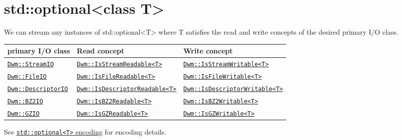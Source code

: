\begin{minipage}{\textwidth}
\section{\ttfamily std::optional<class T>}
We can stream any instances of {\ttfamily std::optional<T>} where
{\ttfamily T} satisfies the read and write concepts of the desired
primary I/O class.
\vspace{1ex}

\begin{tabular}{lll}
  \textbf{primary I/O class} & \textbf{Read concept} & \textbf{Write concept} \\ \hline
  \hyperref[section:DwmStreamIOClass]{\texttt{Dwm::StreamIO}} & \hyperref[concept:DwmIsStreamReadable]{\texttt{Dwm::IsStreamReadable<T>}} & \hyperref[concept:DwmIsStreamWritable]{\texttt{Dwm::IsStreamWritable<T>}} \\
  \hyperref[section:DwmFileIOClass]{\texttt{Dwm::FileIO}} & \hyperref[concept:DwmIsFileReadable]{\texttt{Dwm::IsFileReadable<T>}} & \hyperref[concept:DwmIsFileWritable]{\texttt{Dwm::IsFileWritable<T>}} \\
  \hyperref[section:DwmDescriptorIOClass]{\texttt{Dwm::DescriptorIO}} & \hyperref[concept:DwmIsDescriptorReadable]{\texttt{Dwm::IsDescriptorReadable<T>}} & \hyperref[concept:DwmIsDescriptorWritable]{\texttt{Dwm::IsDescriptorWritable<T>}} \\
  \hyperref[section:DwmBZ2IOClass]{\texttt{Dwm::BZ2IO}} & \hyperref[concept:DwmIsBZ2Readable]{\texttt{Dwm::IsBZ2Readable<T>}} & \hyperref[concept:DwmIsBZ2Writable]{\texttt{Dwm::IsBZ2Writable<T>}} \\
  \hyperref[section:DwmGZIOClass]{\texttt{Dwm::GZIO}} & \hyperref[concept:DwmIsGZReadable]{\texttt{Dwm::IsGZReadable<T>}} & \hyperref[concept:DwmIsGZWritable]{\texttt{Dwm::IsGZWritable<T>}} \\
\end{tabular}
\vspace{1ex}

See \hyperref[encoding:stdOptional]{\texttt{std::optional<T>} encoding} for
encoding details.
\end{minipage}

